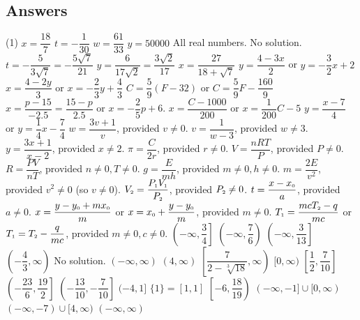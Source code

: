 \newpage

\subsection{Answers}

\begin{tasks}(1)
\task $x = \dfrac{18}{7}$
\task $t = -\dfrac{1}{30}$
\task $w = \dfrac{61}{33}$
\task  $y = 50000$
\task  All real numbers.
\task  No solution.
\task  $t = -\dfrac{5}{3\sqrt{7}} = -\dfrac{5\sqrt{7}}{21}$
\task  $y = \dfrac{6}{17\sqrt{2}}  = \dfrac{3 \sqrt{2}}{17}$
\task  $x = \dfrac{27}{18+\sqrt{7}}$
\task  $y = \dfrac{4 - 3x}{2}$ or $y = -\dfrac{3}{2}x + 2$
\task  $x = \dfrac{4 - 2y}{3}$ or $x = -\dfrac{2}{3} y + \dfrac{4}{3}$
\task  $C = \dfrac{5}{9}(F - 32)$ or  $C = \dfrac{5}{9} F - \dfrac{160}{9}$
\task  $x = \dfrac{p - 15}{-2.5} = \dfrac{15-p}{2.5}$ or $x = -\dfrac{2}{5} p + 6$.
\task  $x = \dfrac{C - 1000}{200}$ or $x = \dfrac{1}{200} C - 5$
\task  $y = \dfrac{x-7}{4}$ or $y = \dfrac{1}{4} x - \dfrac{7}{4}$
\task  $w = \dfrac{3v+1}{v}$, provided $v \neq 0$.
\task  $v = \dfrac{1}{w-3}$, provided $w \neq 3$.
\task $y = \dfrac{3x+1}{x-2}$, provided $x \neq 2$.
\task $\pi = \dfrac{C}{2r}$, provided $r \neq 0$.
\task $V = \dfrac{nRT}{P}$, provided $P \neq 0$.
\task $R = \dfrac{PV}{nT}$, provided $n \neq 0, T \neq 0$.
\task $g = \dfrac{E}{mh}$, provided $m \neq 0, h \neq 0$.
\task $m = \dfrac{2E}{v^2}$, provided $v^2 \neq 0$ (so $v \neq 0$).
\task $V_{\text{\tiny $2$}} = \dfrac{P_{\text{\tiny $1$}}V_{\text{\tiny $1$}}}{P_{\text{\tiny $2$}}}$, provided $P_{\text{\tiny $2$}} \neq 0$. 
\task $t = \dfrac{x - x_{\text{\tiny $0$}}}{a}$, provided $a \neq 0$.
\task $x = \dfrac{y-y_{\text{\tiny $0$}} + mx_{\text{\tiny $0$}}}{m}$ or $x = x_{\text{\tiny $0$}} + \dfrac{y-y_{\text{\tiny $0$}}}{m}$, provided $m \neq 0$. 
\task $T_{\text{\tiny $1$}} = \dfrac{mcT_{\text{\tiny $2$}} - q}{mc}$ or $T_{\text{\tiny $1$}} = T_{\text{\tiny $2$}} - \dfrac{q}{mc} $, provided $m \neq 0, c \neq 0$.  
\task $\left(-\infty, \dfrac{3}{4}\right]$
\task $\left(-\infty, \dfrac{7}{6} \right)$  
\task  $\left( -\infty,  \dfrac{3}{13}\right]$
\task $\left(-\dfrac{4}{3}, \infty\right)$
\task No solution.
\task $(-\infty, \infty)$
\task $(4, \infty)$\vphantom{$\left[ \dfrac{7}{2 - \sqrt[3]{18}}, \infty\right)$
}
\task  $\left[ \dfrac{7}{2 - \sqrt[3]{18}}, \infty\right)$
\task   $[0, \infty)$\vphantom{$\left[ \dfrac{7}{2 - \sqrt[3]{18}}, \infty\right)$
}
\task $\left[ \dfrac{1}{2}, \dfrac{7}{10}\right]$
\task $\left(-\dfrac{23}{6}, \dfrac{19}{2} \right]$
\task $\left(-\dfrac{13}{10}, -\dfrac{7}{10} \right]$
\task  $(-4,1]$\vphantom{$\left[-6, \dfrac{18}{19} \right)$}
\task  $\{1 \} = [1,1]$ \vphantom{$\left[-6, \dfrac{18}{19} \right)$}
\task  $\left[-6, \dfrac{18}{19} \right)$
\task  $(-\infty, -1] \cup [0, \infty)$ 
\task   $(-\infty, -7) \cup [4, \infty)$
\task   $(-\infty, \infty)$
\end{tasks}
